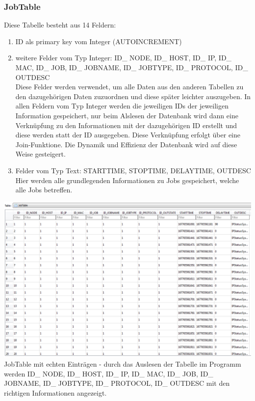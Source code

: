 \documentclass[12pt,a4paper]{report}
\begin{document}
\begin{onehalfspace}
\subsubsection{JobTable}
Diese Tabelle besteht aus 14 Feldern:
\begin{enumerate}
\item ID als primary key vom Integer (AUTOINCREMENT)
\item weitere Felder vom Typ Integer: ID\_ NODE, ID\_ HOST, ID\_ IP, ID\_ MAC, ID\_ JOB, ID\_ JOBNAME, ID\_ JOBTYPE, ID\_ PROTOCOL, ID\_ OUTDESC\\
Diese Felder werden verwendet, um alle Daten aus den anderen Tabellen zu den dazugehörigen Daten zuzuordnen und diese später leichter auszugeben. In allen Feldern vom Typ Integer werden die jeweiligen IDs der jeweiligen Information gespeichert, nur beim Alslesen der Datenbank wird dann eine Verknüpfung zu den Informationen mit der dazugehörigen ID erstellt und diese werden statt der ID ausgegeben.  Diese Verknüpfung erfolgt über eine Join-Funktione. Die Dynamik und Effizienz der Datenbank wird auf diese Weise gesteigert.
\item Felder vom Typ Text: STARTTIME, STOPTIME, DELAYTIME, OUTDESC\\
Hier werden alle grundlegenden Informationen zu Jobs gespeichert, welche alle Jobs betreffen.
\end{enumerate}
\begin{center}
\includegraphics[scale=0.5]{img/db-tb-job.png}\\
JobTable mit echten Einträgen - durch das Auslesen der Tabelle im Programm werden ID\_ NODE, ID\_ HOST, ID\_ IP, ID\_ MAC, ID\_ JOB, ID\_ JOBNAME, ID\_ JOBTYPE, ID\_ PROTOCOL, ID\_ OUTDESC mit den richtigen Informationen angezeigt.
\end{center}

\end{onehalfspace}
\end{document}
